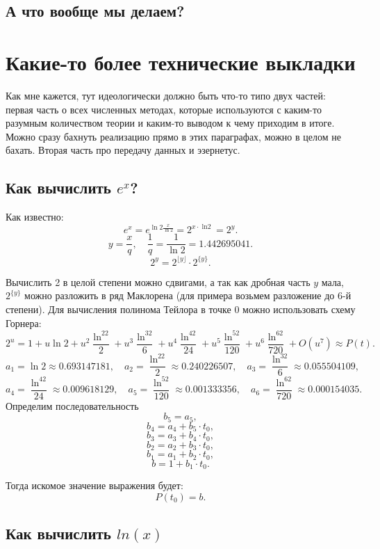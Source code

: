 \documentclass{article}
\begin{document}
\subsection{А что вообще мы делаем?}

\newpage
\section{Какие-то более технические выкладки}

Как мне кажется, тут идеологически должно быть что-то типо двух частей: первая часть о всех численных методах, которые используются с каким-то разумным количеством теории и каким-то выводом к чему приходим в итоге. Можно сразу бахнуть реализацию прямо в этих параграфах, можно в целом не бахать. Вторая часть про передачу данных и эзернетус. 

\subsection{Как вычислить $e^x$?}
Как известно:
\[
e^{x} = e^{\operatorname{ln}2 \frac{x}{\operatorname{ln}2}} = 2^{x\cdot \operatorname{ln2}} = 2^y.
\]
\[
y = \frac{x}{q}, \quad \frac{1}{q} = \frac{1}{\operatorname{ln}2} = 1.442695041.
\]
\[
2^y = 2^{\lfloor y \rfloor} \cdot 2^{\{ y \} }.
\]

Вычислить 2 в целой степени можно сдвигами, а так как дробная часть $y$ мала, $2^{\{ y \} }$ можно разложить в ряд Маклорена (для примера возьмем разложение до 6-й степени). Для вычисления полинома Тейлора в точке 0 можно использовать схему Горнера:
\[
2^u = 1 + u \operatorname{ln}2 + u^2 \frac{\operatorname{ln}^22}{2}  + u^3\frac{\operatorname{ln}^32}{6} + u^4 \frac{\operatorname{ln}^42}{24} + u^5 \frac{\operatorname{ln}^52}{120} + u^6\frac{\operatorname{ln}^62}{720} + O(u^7) \approx P(t).
\]
\[
a_1 = \operatorname{ln}2 \approx 0.693147181, \quad
a_2 = \frac{\operatorname{ln}^22}{2} \approx 0.240226507, \quad
a_3 = \frac{\operatorname{ln}^32}{6} \approx 0.055504109,
\]
\[
a_4 = \frac{\operatorname{ln}^42}{24} \approx 0.009618129, \quad
a_5 = \frac{\operatorname{ln}^52}{120} \approx 0.001333356, \quad
a_6 = \frac{\operatorname{ln}^62}{720} \approx 0.000154035.
\]
Определим последовательность
\[
b_5 = a_5,
\]
\[
b_4 = a_4 + b_5 \cdot t_0,
\]
\[
b_3 = a_3 + b_4\cdot t_0,
\]
\[
b_2 = a_2 + b_3\cdot t_0,
\]
\[
b_1 = a_1 + b_2 \cdot t_0,
\]
\[
b = 1 + b_1 \cdot t_0.
\]

Тогда искомое значение выражения будет:
\[
P(t_0) = b.
\]
\subsection{Как вычислить $ln(x)$}
\end{document}
